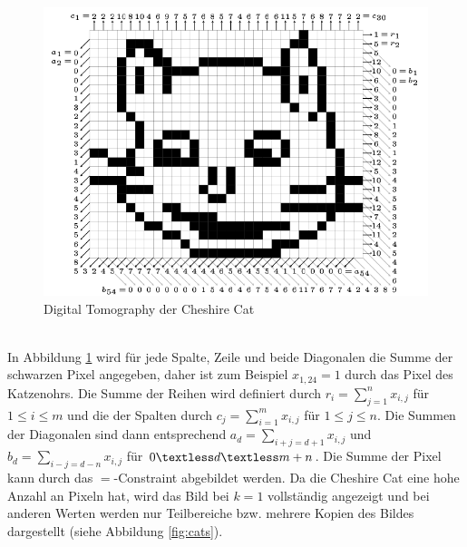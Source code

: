 \documentclass[a4,abstract=on]{scrartcl}
\begin{document}
\begin{figure}[H]
\centering
\includegraphics[width=\textwidth]{cheshire.png}
\caption{Digital Tomography der Cheshire Cat \cite[vgl.][Seite 25]{Knuth}}
\label{fig:cheshire}
\end{figure}
\ \\
In Abbildung \ref{fig:cheshire} wird für jede Spalte, Zeile und beide Diagonalen die Summe der schwarzen Pixel angegeben, daher ist zum Beispiel $x_{1,24}=1$ durch das Pixel des Katzenohrs. Die Summe der Reihen wird definiert durch $r_i=\sum_{j=1}^{n} x_{i,j}$ für $1 \leq i \leq m$ und die der Spalten durch $c_j=\sum_{i=1}^{m} x_{i,j}$ für $1 \leq j \leq n$. Die Summen der Diagonalen sind dann entsprechend $a_d=\sum_{i+j=d+1} x_{i,j}$ und $b_d=\sum_{i-j=d-n} x_{i,j}$ für $0 \textless d \textless m+n$. Die Summe der Pixel kann durch das $=$-Constraint abgebildet werden. Da die Cheshire Cat eine hohe Anzahl an Pixeln hat, wird das Bild bei $k=1$ vollständig angezeigt und bei anderen Werten werden nur Teilbereiche bzw. mehrere Kopien des Bildes dargestellt (siehe Abbildung \ref{fig:cats}).
\end{document}
